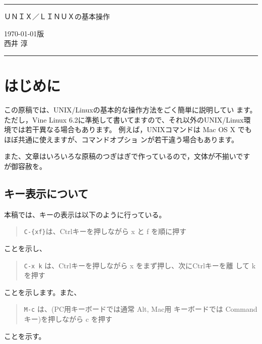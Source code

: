 \documentclass{jreport}
\begin{document}
\pagestyle{empty}
\noindent
\rule{\linewidth}{1pt}
\begin{center}
  {\Huge\gtfamily ＵＮＩＸ／ＬＩＮＵＸの基本操作}
\end{center}
\begin{flushright}
\today 版\\
西井 淳
\end{flushright}
\rule{\linewidth}{1pt} 

\newpage
{}
\setcounter{page}{1}
\tableofcontents

\newpage
{}
\setcounter{page}{1}
\pagestyle{fancy}

\chapter*{はじめに}

この原稿では、UNIX/Linuxの基本的な操作方法をごく簡単に説明してい
ます。
ただし，Vine Linux 6.2に準拠して書いてますので、それ以外のUNIX/Linux環
境では若干異なる場合もあります。
例えば，UNIXコマンドは Mac OS X でもほぼ共通に使えますが、コマンドオプショ
ンが若干違う場合もあります。

また、文章はいろいろな原稿のつぎはぎで作っているので，文体が不揃いです
が御容赦を。



\section*{キー表示について}

本稿では、キーの表示は以下のように行っている。
\begin{quote}
  \verb|C-{xf}|は、Ctrlキーを押しながら x と f を順に押す
\end{quote}
ことを示し、
\begin{quote}
  \verb|C-x k| は、Ctrlキーを押しながら x をまず押し、次にCtrlキーを離  
  して k を押す
\end{quote}
ことを示します。また、
\begin{quote}
  \verb|M-c| は、(PC用キーボードでは通常 Alt, Mac用
  キーボードでは Command キー)を押しながら c を押す
\end{quote}
ことを示す。
\end{document}
